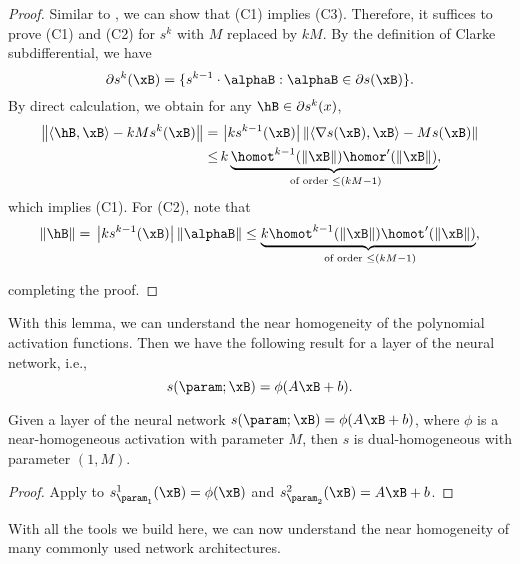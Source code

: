 \begin{proof}
    Similar to , we can show that (C1) implies (C3). Therefore, it suffices to prove (C1) and (C2) for $s^k$ with $M$ replaced by $kM$. By the definition of Clarke subdifferential, we have 
    \[
        \partial s^k (\xB) = \{ s^{k-1} \cdot \alphaB : \alphaB \in \partial s(\xB) \}.
    \] 
    By direct calculation, we obtain for any $ \hB \in \partial s^k(x) $,
    \begin{align*}
        \left\| \langle \hB, \xB \rangle - kM s^k (\xB) \right\| = \, & \left\vert k s^{k-1} (\xB) \right\vert \left\| \langle \nabla s (\xB), \xB \rangle - M s (\xB) \right\| \\
        \le \, & k \underbrace{\homot^{k-1} (\| \xB \|) \homor'(\| \xB \|)}_{\text{ of order } \le (kM-1)},
    \end{align*}
    which implies (C1). For (C2), note that
\[
 \left\| \hB \right\| = \, \left\vert k s^{k-1} (\xB) \right\vert \left\| \alphaB \right\| \le \underbrace{k\homot^{k-1} (\| \xB \|) \homot'(\| \xB \|)}_{\text{ of order }\le (kM-1)} ,
\]

    completing the proof.
\end{proof}

With this lemma, we can understand the near homogeneity of the polynomial activation functions. Then we have the following result for a layer of the neural network, i.e., 
\[
    s(\param; \xB) = \phi(A \xB + b). 
\]

\begin{corollary}
    \label{cor: Near homogeneity layer}
    Given a layer of the neural network $s(\param; \xB) = \phi(A \xB + b)$, where $\phi$ is a near-homogeneous activation with parameter $M$, then $s$ is dual-homogeneous with parameter $(1,M)$.
\end{corollary}

\begin{proof}
    Apply  to $s_{\param_1}^1 (\xB) = \phi(\xB)$ and $s_{\param_2}^2 (\xB) = A \xB + b$.
\end{proof}

With all the tools we build here, we can now understand the near homogeneity of many commonly used network architectures.  


